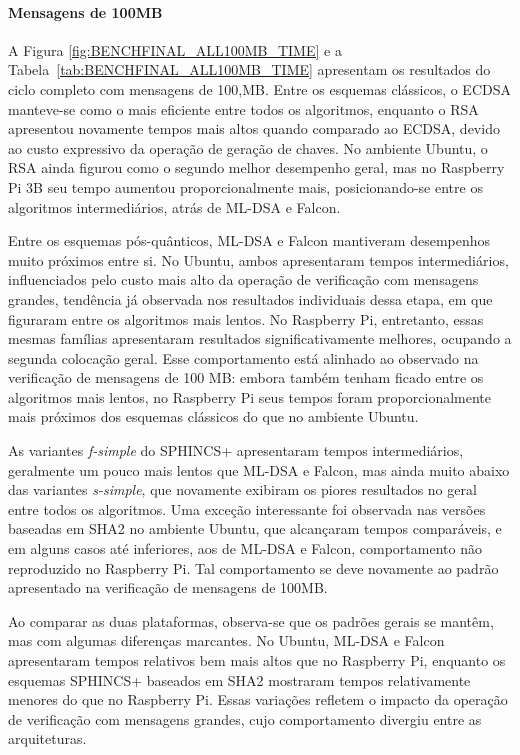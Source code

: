 \paragraph{Mensagens de 100MB}

A Figura \ref{fig:BENCHFINAL_ALL100MB_TIME} e a Tabela~\ref{tab:BENCHFINAL_ALL100MB_TIME} apresentam os resultados do ciclo completo com mensagens de 100,MB. Entre os esquemas clássicos, o ECDSA manteve-se como o mais eficiente entre todos os algoritmos, enquanto o RSA apresentou novamente tempos mais altos quando comparado ao ECDSA, devido ao custo expressivo da operação de geração de chaves. No ambiente Ubuntu, o RSA ainda figurou como o segundo melhor desempenho geral, mas no Raspberry Pi 3B seu tempo aumentou proporcionalmente mais, posicionando-se entre os algoritmos intermediários, atrás de ML-DSA e Falcon.

Entre os esquemas pós-quânticos, ML-DSA e Falcon mantiveram desempenhos muito próximos entre si. No Ubuntu, ambos apresentaram tempos intermediários, influenciados pelo custo mais alto da operação de verificação com mensagens grandes, tendência já observada nos resultados individuais dessa etapa, em que figuraram entre os algoritmos mais lentos. No Raspberry Pi, entretanto, essas mesmas famílias apresentaram resultados significativamente melhores, ocupando a segunda colocação geral. Esse comportamento está alinhado ao observado na verificação de mensagens de 100 MB: embora também tenham ficado entre os algoritmos mais lentos, no Raspberry Pi seus tempos foram proporcionalmente mais próximos dos esquemas clássicos do que no ambiente Ubuntu.


As variantes \textit{f-simple} do SPHINCS+ apresentaram tempos intermediários, geralmente um pouco mais lentos que ML-DSA e Falcon, mas ainda muito abaixo das variantes \textit{s-simple}, que novamente exibiram os piores resultados no geral entre todos os algoritmos. Uma exceção interessante foi observada nas versões baseadas em SHA2 no ambiente Ubuntu, que alcançaram tempos comparáveis, e em alguns casos até inferiores, aos de ML-DSA e Falcon, comportamento não reproduzido no Raspberry Pi. Tal comportamento se deve novamente ao padrão apresentado na verificação de mensagens de 100MB.

Ao comparar as duas plataformas, observa-se que os padrões gerais se mantêm, mas com algumas diferenças marcantes. No Ubuntu, ML-DSA e Falcon apresentaram tempos relativos bem mais altos que no Raspberry Pi, enquanto os esquemas SPHINCS+ baseados em SHA2 mostraram tempos relativamente menores do que no Raspberry Pi. Essas variações refletem o impacto da operação de verificação com mensagens grandes, cujo comportamento divergiu entre as arquiteturas.

